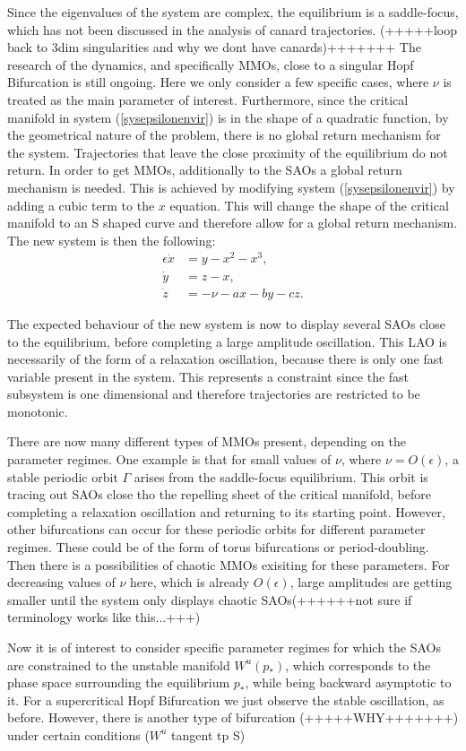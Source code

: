 Since the eigenvalues of the system are complex, the equilibrium is a saddle-focus, which has not been discussed in the analysis of canard trajectories. (+++++loop back to 3dim singularities and why we dont have canards)+++++++
The research of the dynamics, and specifically MMOs, close to a singular Hopf Bifurcation is still ongoing. Here we only consider a few specific cases, where $\nu$ is treated as the main parameter of interest. Furthermore, since the critical manifold in system (\ref{sysepsilonenvir}) is in the shape of a quadratic function, by the geometrical nature of the problem, there is no global return mechanism for the system. Trajectories that leave the close proximity of the equilibrium do not return. In order to get MMOs, additionally to the SAOs a global return mechanism is needed.
This is achieved by modifying system (\ref{sysepsilonenvir}) by adding a cubic term to the $x$ equation. This will change the shape of the critical manifold to an S shaped curve and therefore allow for a global return mechanism. The new system is then the following:
\begin{align*}
\epsilon \dot{x} &= y - x^2 - x^3, \\
\dot{y} &= z - x, \\
\dot{z} &= -\nu -ax -by -cz.
\end{align*}

The expected behaviour of the new system is now to display several SAOs close to the equilibrium, before completing a large amplitude oscillation. This LAO is necessarily of the form of a relaxation oscillation, because there is only one fast variable present in the system. This represents a constraint since the fast subsystem is one dimensional and therefore trajectories are restricted to be monotonic.

There are now many different types of MMOs present, depending on the parameter regimes. 
One example is that for small values of $\nu$, where $\nu=O(\epsilon)$, a stable periodic orbit $\Gamma$ arises from the saddle-focus equilibrium. This orbit is tracing out SAOs close tho the repelling sheet of the critical manifold, before completing a relaxation oscillation and returning to its starting point.
However, other bifurcations can occur for these periodic orbits for different parameter regimes. These could be of the form of torus bifurcations or period-doubling. Then there is a possibilities of chaotic MMOs exisiting for these parameters. For decreasing values of $\nu$ here, which is already $O(\epsilon)$, large amplitudes are getting smaller until the system only displays chaotic SAOs(++++++not sure if terminology works like this...+++)

Now it is of interest to consider specific parameter regimes for which the SAOs are constrained to the unstable manifold $W^u(p_*)$, which corresponds to the phase space surrounding the equilibrium $p_*$, while being backward asymptotic to it. 
For a supercritical Hopf Bifurcation we just observe the stable oscillation, as before. However, there is another type of bifurcation (+++++WHY+++++++) under certain conditions ($W^u$ tangent tp S)








